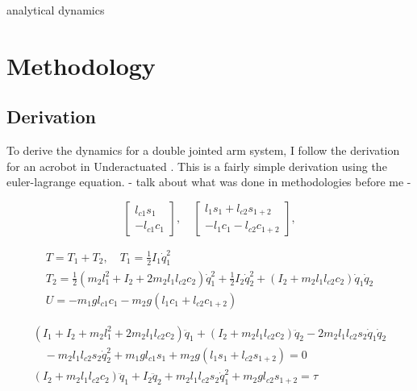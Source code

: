 \documentclass{article}
\begin{document}



    analytical dynamics


\section*{Methodology}

    \subsection*{Derivation}

    To derive the dynamics for a double jointed arm system, I follow the derivation for an acrobot in Underactuated \cite{underactuated}. This is a fairly simple derivation using the euler-lagrange equation.
    - talk about what was done in methodologies before me
    - 
    
    \begin{equation}
        \begin{bmatrix} l_{c1} s_1 \\ -l_{c1} c_1 \end{bmatrix}, \quad
        \begin{bmatrix} l_1 s_1 + l_{c2} s_{1+2} \\ -l_1 c_1 - l_{c2}
        c_{1+2} \end{bmatrix},
    \end{equation}

    \begin{gather} T = T_1 + T_2, \quad T_1 = \frac{1}{2} I_1 \dot{q}_1^2
        \\ T_2 = \frac{1}{2} ( m_2 l_1^2 + I_2 + 2 m_2 l_1 l_{c2} c_2 )
        \dot{q}_1^2 + \frac{1}{2} I_2 \dot{q}_2^2 + (I_2 + m_2 l_1 l_{c2} c_2)
        \dot{q}_1 \dot{q}_2 \\ 
            U = -m_1 g l_{c1} c_1 - m_2 g (l_1 c_1 +
        l_{c2} c_{1+2}) \end{gather}

    \begin{gather} (I_1 + I_2 + m_2 l_1^2 +
        2m_2 l_1 l_{c2} c_2) \ddot{q}_1 + (I_2 + m_2 l_1 l_{c2} c_2)\ddot{q}_2 -
        2m_2 l_1 l_{c2} s_2 \dot{q}_1 \dot{q}_2 \\ \quad -m_2 l_1 l_{c2} s_2
        \dot{q}_2^2 + m_1 g l_{c1}s_1 + m_2 g (l_1 s_1 + l_{c2} s_{1+2}) = 0 \\
        (I_2 + m_2 l_1 l_{c2} c_2) \ddot{q}_1 + I_2 \ddot{q}_2 + m_2 l_1 l_{c2}
        s_2 \dot{q}_1^2 + m_2 g l_{c2} s_{1+2} = \tau \end{gather}
\end{document}
